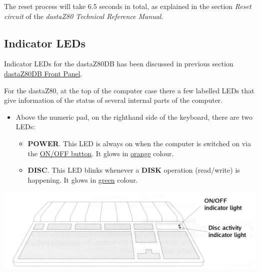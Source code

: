     The reset process will take 6.5 seconds in total, as explained in the
    section \textit{Reset circuit} of the \textit{dastaZ80 Technical Reference
    Manual}\cite{dastaz80techman}.

    \subsection{Indicator LEDs}

    Indicator LEDs for the dastaZ80DB has been discussed in previous section
    \hyperref[subsec:frontpanel]{dastaZ80DB Front Panel}.

    For the dastaZ80, at the top of the computer case there a few labelled
    LEDs that give information of the  status of several internal parts of the
    computer.

    \begin{itemize}
        \item Above the numeric pad, on the righthand side of the keyboard,
        there are two LEDs:
        \begin{itemize}
            \item \textbf{POWER}. This LED is always on when the computer is
            switched on via the \hyperref[subsec:onoffbutt]{ON/OFF button}. It glows
            in \underline{orange} colour.
            \item \textbf{DISC}. This LED blinks whenever a \textbf{DISK} operation
            (read/write) is happening. It glows in \underline{green} colour.
        \end{itemize}
    \end{itemize}
    
    \centerline{\includegraphics[scale=0.5]{images/keyboardLEDs.png}}

